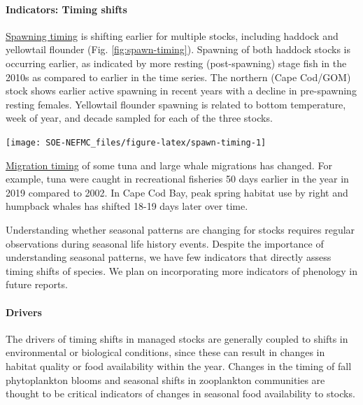 \documentclass[
  10pt,
]{article}
\let\origfigure\figure
\let\endorigfigure\endfigure
\renewenvironment{figure}[1][2] {
    \expandafter\origfigure\expandafter[H]
} {
    \endorigfigure
}
\begin{document}
\hypertarget{indicators-timing-shifts}{%
\paragraph{Indicators: Timing shifts}\label{indicators-timing-shifts}}

\href{https://noaa-edab.github.io/catalog/spawn_timing.html}{Spawning timing} is shifting earlier for multiple stocks, including haddock and yellowtail flounder (Fig. \ref{fig:spawn-timing}). Spawning of both haddock stocks is occurring earlier, as indicated by more resting (post-spawning) stage fish in the 2010s as compared to earlier in the time series. The northern (Cape Cod/GOM) stock shows earlier active spawning in recent years with a decline in pre-spawning resting females. Yellowtail flounder spawning is related to bottom temperature, week of year, and decade sampled for each of the three stocks.

\begin{figure}

{\centering \texttt{[image: SOE-NEFMC\_files/figure-latex/spawn-timing-1]} 

}

\caption{Percent resting stage (non-spawning) fish from two haddock and three yellowtail flounder stocks: CC = Cape Cod Gulf of Maine, GOM = Gulf of Maine, GB = Georges Bank, SNE = Southern New England.}\label{fig:spawn-timing}
\end{figure}

\href{https://noaa-edab.github.io/catalog/timing_shifts.html}{Migration timing} of some tuna and large whale migrations has changed. For example, tuna were caught in recreational fisheries 50 days earlier in the year in 2019 compared to 2002. In Cape Cod Bay, peak spring habitat use by right and humpback whales has shifted 18-19 days later over time.

Understanding whether seasonal patterns are changing for stocks requires regular observations during seasonal life history events. Despite the importance of understanding seasonal patterns, we have few indicators that directly assess timing shifts of species. We plan on incorporating more indicators of phenology in future reports.

\hypertarget{drivers-1}{%
\paragraph{Drivers}\label{drivers-1}}

The drivers of timing shifts in managed stocks are generally coupled to shifts in environmental or biological conditions, since these can result in changes in habitat quality or food availability within the year. Changes in the timing of fall phytoplankton blooms and seasonal shifts in zooplankton communities are thought to be critical indicators of changes in seasonal food availability to stocks.
\end{document}
